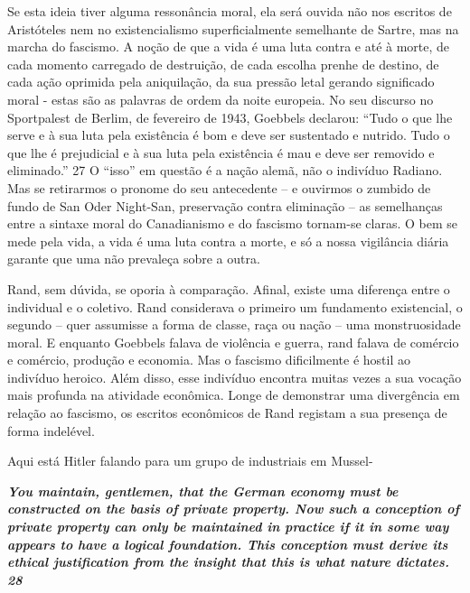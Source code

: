 \par
 
Se esta ideia tiver alguma ressonância moral, ela será ouvida não nos escritos de Aristóteles nem no existencialismo superficialmente semelhante de Sartre, mas na marcha do fascismo. A noção de que a vida é uma luta contra e até à morte, de cada momento carregado de destruição, de cada escolha prenhe de destino, de cada ação oprimida pela aniquilação, da sua pressão letal gerando significado moral - estas são as palavras de ordem da noite europeia. No seu discurso no Sportpalest de Berlim, de fevereiro de 1943, Goebbels declarou: “Tudo o que lhe serve e à sua luta pela existência é bom e deve ser sustentado e nutrido. Tudo o que lhe é prejudicial e à sua luta pela existência é mau e deve ser removido e eliminado.”
 {\color{blue} 27}  
O “isso” em questão é a nação alemã, não o indivíduo Radiano. Mas se retirarmos o pronome do seu antecedente – e ouvirmos o zumbido de fundo de San Oder Night-San, preservação contra eliminação – as semelhanças entre a sintaxe moral do Canadianismo e do fascismo tornam-se claras. O bem se mede pela vida, a vida é uma luta contra a morte, e só a nossa vigilância diária garante que uma não prevaleça sobre a outra.
 
\par
 
Rand, sem dúvida, se oporia à comparação. Afinal, existe uma diferença entre o individual e o coletivo. Rand considerava o primeiro um fundamento existencial, o segundo – quer assumisse a forma de classe, raça ou nação – uma monstruosidade moral. E enquanto Goebbels falava de violência e guerra, rand falava de comércio e comércio, produção e economia. Mas o fascismo dificilmente é hostil ao indivíduo heroico. Além disso, esse indivíduo encontra muitas vezes a sua vocação mais profunda na atividade econômica. Longe de demonstrar uma divergência em relação ao fascismo, os escritos econômicos de Rand registam a sua presença de forma indelével.
 
\par
 
Aqui está Hitler falando para um grupo de industriais em Mussel-
 
\par
 

 \textbf{\textit{You maintain, gentlemen, that the German economy must be constructed on the basis of private property. Now such a conception of private property can only be maintained in practice if it in some way appears to have a logical foundation. This conception must derive its ethical justification from the insight that this is what nature dictates. {{\color{blue} 28} } } }  
 
